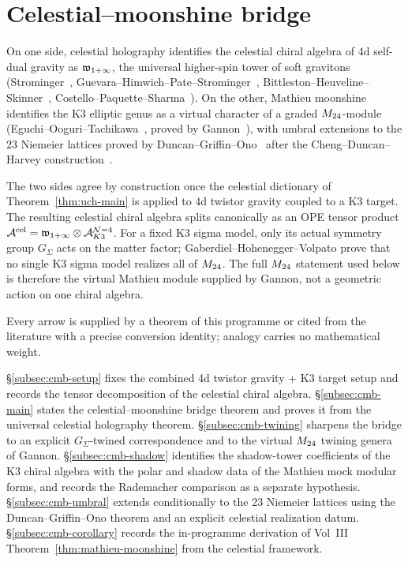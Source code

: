 \section{Celestial--moonshine bridge}
\label{sec:celestial-moonshine-bridge}

\noindent
On one side, celestial holography identifies the celestial chiral algebra of $4$d
self-dual gravity as $\mathfrak w_{1+\infty}$, the universal higher-spin tower of soft
gravitons (Strominger~\cite{StromingerWInfinityCelestial},
Guevara--Himwich--Pate--Strominger~\cite{GuevaraHimwichPateStrominger21},
Bittleston--Heuveline--Skinner~\cite{BittlestonHeuvelineSkinner},
Costello--Paquette--Sharma~\cite{CostelloPaquetteSharmaCelestial}). On the
other, Mathieu moonshine identifies the K3 elliptic genus as a virtual character
of a graded $M_{24}$-module
(Eguchi--Ooguri--Tachikawa~\cite{EguchiOoguriTachikawa10},
proved by Gannon~\cite{Gannon16}), with umbral extensions to the $23$
Niemeier lattices proved by Duncan--Griffin--Ono~\cite{DuncanGriffinOno15}
after the Cheng--Duncan--Harvey construction~\cite{ChengDuncanHarvey1,
ChengDuncanHarvey2}.

The two sides agree by construction once
the celestial dictionary of
Theorem~\ref{thm:uch-main} is applied to $4$d twistor gravity coupled
to a K3 target. The resulting celestial chiral algebra splits
canonically as an OPE tensor product
$\mathcal A^{\mathrm{cel}} = \mathfrak w_{1+\infty} \otimes \mathcal A^{\mathcal{N}{=}4}_{K3}$.
For a fixed K3 sigma model, only its actual symmetry group
$G_\Sigma$ acts on the matter factor; Gaberdiel--Hohenegger--Volpato
\cite{GaberdielHoheneggerVolpato11} prove that no single K3 sigma
model realizes all of $M_{24}$.  The full $M_{24}$ statement used
below is therefore the virtual Mathieu module supplied by Gannon, not
a geometric action on one chiral algebra.

Every arrow is supplied by a theorem of this programme or cited from the literature
with a precise conversion identity; analogy carries no mathematical
weight.

\S\ref{subsec:cmb-setup} fixes the combined 4d twistor gravity + K3
target setup and records the tensor decomposition of the celestial
chiral algebra.
\S\ref{subsec:cmb-main} states the celestial--moonshine bridge theorem
and proves it from the universal celestial holography theorem.
\S\ref{subsec:cmb-twining} sharpens the bridge to an explicit
$G_\Sigma$-twined correspondence and to the virtual $M_{24}$ twining
genera of Gannon.
\S\ref{subsec:cmb-shadow} identifies the shadow-tower coefficients of
the K3 chiral algebra with the polar and shadow data of the Mathieu
mock modular forms, and records the Rademacher comparison as a
separate hypothesis.
\S\ref{subsec:cmb-umbral} extends conditionally to the 23 Niemeier
lattices using the Duncan--Griffin--Ono theorem and an explicit
celestial realization datum.
\S\ref{subsec:cmb-corollary} records the in-programme derivation of Vol~III
Theorem~\ref{thm:mathieu-moonshine} from the celestial framework.

